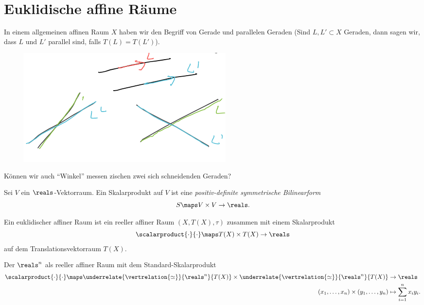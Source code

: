 \section{Euklidische affine Räume}
In einem allgemeinen affinen Raum \( X \) haben wir den Begriff von Gerade und parallelen Geraden (Sind \( L,L'\subset X \) Geraden, dann sagen wir, dass \( L \) und \( L' \) parallel sind, falls \( T(L)=T(L') \)).
\begin{figure}[H]
  \centering
  \includegraphics[width=0.5\linewidth]{figures/affine_geraden_lagebeziehungen}
  \label{fig:affine_geraden_lagebeziehungen}
\end{figure}
\begin{frage*}
  Können wir auch \enquote{Winkel} messen zischen zwei sich schneidenden Geraden?
\end{frage*}
\begin{erinnerung*}
  Sei \( V \) ein \( \reals \)-Vektorraum. Ein Skalarprodukt auf \( V \) ist eine \emph{positiv-definite symmetrische Bilinearform}
  \begin{equation*}
    S\maps V\times V\to \reals.
  \end{equation*}
\end{erinnerung*}
\begin{definition*}
  Ein euklidischer affiner Raum ist ein reeller affiner Raum \( (X,T(X),\tau) \) zusammen mit einem Skalarprodukt
  \begin{equation*}
    \scalarproduct{\cdot}{\cdot}\maps T(X)\times T(X)\to \reals
  \end{equation*}
  auf dem Translationsvektorraum \( T(X) \).
\end{definition*}
\begin{beispiel}
  Der \( \reals^n \) als reeller affiner Raum mit dem Standard-Skalarprodukt
  \begin{equation*}
    \begin{split}
      \scalarproduct{\cdot}{\cdot}\maps \underrelate{\vertrelation{\simeq}}{\reals^n}{T(X)}\times \underrelate{\vertrelation{\simeq}}{\reals^n}{T(X)}&\to \reals\\
      (x_1,\dotsc,x_n)\times (y_1,\dotsc,y_n)&\mapsto \sum_{i=1}^{n}x_i y_i.
    \end{split}
  \end{equation*}
\end{beispiel}

